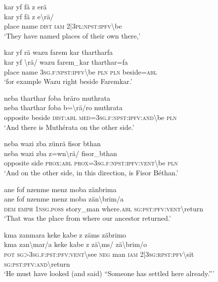 \ea\label{ex:2:a1642}
kar yf fä z erä\\
\gll kar	yf	fä	z	e{\textbackslash}rä/\\
     place	name	\textsc{dist}	\textsc{iam}	2|3\textsc{pl}:\textsc{npst}:\textsc{ipfv}{\textbackslash}be\\
\glt `They have named places of their own there,'
\z

\ea\label{ex:2:a1643}
kar yf rä wazu farem kar thartharfa\\
\gll kar	yf	{\textbackslash}rä/	wazu	farem\_kar	tharthar=fa\\
     place	name	3\textsc{sg}.\textsc{f}:\textsc{npst}:\textsc{ipfv}{\textbackslash}be	\textsc{pln}	\textsc{pln}	beside=\textsc{abl}\\
\glt `for example Wazu right beside Faremkar.'
\z

\ea\label{ex:2:a1645}
neba tharthar foba bräro muthrata\\
\gll neba	tharthar	foba	b={\textbackslash}rä/ro	muthrata\\
     opposite	beside	\textsc{dist}:\textsc{abl}	\textsc{med}=3\textsc{sg}.\textsc{f}:\textsc{npst}:\textsc{ipfv}:\textsc{and}{\textbackslash}be	\textsc{pln}\\
\glt `And there is Muthérata on the other side.'
\z

\ea\label{ex:2:a1646}
neba wazi zba zünrä fisor bthan\\
\gll neba	wazi	zba	z=wn{\textbackslash}rä/	fisor\_bthan\\
     opposite	side	\textsc{prox}:\textsc{abl}	\textsc{prox}=3\textsc{sg}.\textsc{f}:\textsc{npst}:\textsc{ipfv}:\textsc{vent}{\textbackslash}be	\textsc{pln}\\
\glt `And on the other side, in this direction, is Fisor Béthan.'
\z

\ea\label{ex:2:a1648}
ane fof nzenme menz moba zänbrima\\
\gll ane	fof	nzenme	menz	moba	zän{\textbackslash}brim/a\\
     \textsc{dem}	\textsc{emph}	1\textsc{nsg}.\textsc{poss}	story\_man	where.\textsc{abl}	\textsc{sg}:\textsc{pst}:\textsc{pfv}:\textsc{vent}{\textbackslash}return\\
\glt `That was the place from where our ancestor returned.'
\z

\ea\label{ex:2:a1649}
kma zanmara keke kabe z zäms zäbrimo\\
\gll kma	zan{\textbackslash}mar/a	keke	kabe	z	zä{\textbackslash}ms/	zä{\textbackslash}brim/o\\
     \textsc{pot}	\textsc{sg}>3\textsc{sg}.\textsc{f}:\textsc{pst}:\textsc{pfv}:\textsc{vent}{\textbackslash}see	\textsc{neg}	man	\textsc{iam}	2|3\textsc{sg}:\textsc{rpst}:\textsc{pfv}{\textbackslash}sit	\textsc{sg}:\textsc{pst}:\textsc{pfv}:\textsc{and}{\textbackslash}return\\
\glt `He must have looked (and said) ``Someone has settled here already.'''
\z

